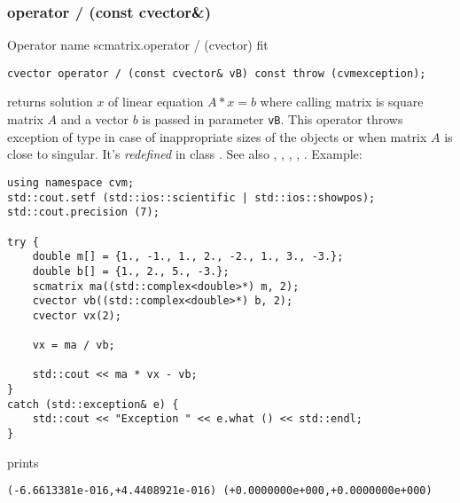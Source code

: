 \subsubsection{operator / (const cvector\&)}
Operator%
\pdfdest name {scmatrix.operator / (cvector)} fit
\begin{verbatim}
cvector operator / (const cvector& vB) const throw (cvmexception);
\end{verbatim}
returns solution $x$ of linear equation
$A*x=b$ where calling matrix is square matrix $A$
and a vector $b$ is passed in parameter \verb"vB".
This operator throws exception 
of type 
in case of inappropriate sizes
of the objects or when  matrix $A$ is close to singular.
It's \emph{redefined} in class .
See also , 
, 
, 
, .
Example:
\begin{Verbatim}
using namespace cvm;
std::cout.setf (std::ios::scientific | std::ios::showpos);
std::cout.precision (7);

try {
    double m[] = {1., -1., 1., 2., -2., 1., 3., -3.};
    double b[] = {1., 2., 5., -3.};
    scmatrix ma((std::complex<double>*) m, 2);
    cvector vb((std::complex<double>*) b, 2);
    cvector vx(2);

    vx = ma / vb;

    std::cout << ma * vx - vb;
}
catch (std::exception& e) {
    std::cout << "Exception " << e.what () << std::endl;
}
\end{Verbatim}
prints
\begin{Verbatim}
(-6.6613381e-016,+4.4408921e-016) (+0.0000000e+000,+0.0000000e+000)
\end{Verbatim}
\newpage





